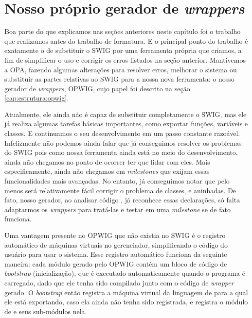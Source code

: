  \section{Nosso próprio gerador de \emph{wrappers}}
  \label{sec:actividads:opwig}
  Boa parte do que explicamos nas seções anteriores neste capítulo foi o trabalho que realizamos
  antes do trabalho de formatura. E o principal ponto do trabalho é exatamente o de substituir 
  o SWIG por uma ferramenta própria que criamos, a fim de simplificar o uso e corrigir os
  erros listados na seção anterior. Mantivemos a OPA, fazendo algumas alterações para resolver
  erros, melhorar o sistema ou substituir as partes relativas ao SWIG para a nossa nova ferramenta:
  o nosso gerador de \textit{wrappers}, OPWIG, cujo papel foi descrito na seção \ref{cap:estrutura:opwig}.
  
  Atualmente, ele ainda não é capaz de substituir completamente o SWIG, mas ele já realiza algumas
  tarefas básicas importantes, como exportar funções, variáveis e classes. E continuamos
  o seu desenvolvimento em um passo constante razoável. Infelizmente não podemos ainda falar que
  já conseguimos resolver os problemas do SWIG pois como nossa ferramenta ainda está no meio
  do desenvolvimento, ainda não chegamos no ponto de ocorrer ter que lidar com eles. Mais
  especificamente, ainda não chegamos em \textit{milestones} que exijam essas funcionalidades
  mais avançadas. No entanto, já conseguimos notar que pelo menos será relativamente fácil corrigir
  o problema de classes,  e  aninhadas. De fato, nosso gerador, ao analisar
  código \CXX{}, já reconhece essas declarações, só falta adaptarmos os \textit{wrappers} para tratá-las
  e testar em uma \textit{milestone} se de fato funciona.
  
  Uma vantagem presente no OPWIG que não existia no SWIG é o registro automático
  de máquinas virtuais no gerenciador, simplificando o código do usuário para usar o sistema. Esse
  registro automático funciona da seguinte maneira: cada módulo gerado pelo OPWIG contém um bloco
  de código de \textit{bootstrap} (inicialização), que é executado automaticamente
  quando o programa é carregado, dado que ele tenha sido compilado junto com o código de \textit{wrapper}
  gerado. O \textit{bootstrap} então registra a máquina virtual da linguagem de \script{} para a qual
  ele está exportando, caso ela ainda não tenha sido registrada, e registra o módulo de
  \script{} e seus sub-módulos nela.
  
